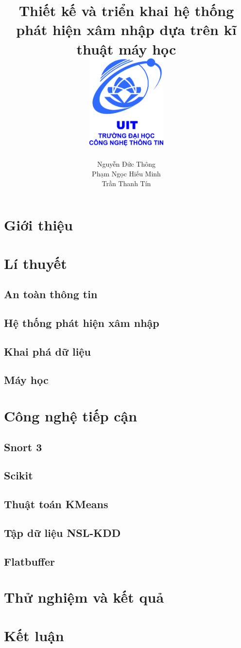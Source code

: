 \documentclass[12pt,twoside]{report}
\title{
    {Thiết kế và triển khai hệ thống phát hiện xâm nhập dựa trên kĩ thuật máy học}\\
    {\includegraphics[width=4cm]{logo}}
}
\author{
    Nguyễn Đức Thông
    \\
    Phạm Ngọc Hiếu Minh
    \\
    Trần Thanh Tín
}
\begin{document}
\maketitle
\newpage
\tableofcontents
\listoffigures
\listoftables
\newpage

    \chapter{Giới thiệu}
    
    \newpage
    \chapter{Lí thuyết}
    \section{An toàn thông tin}
    
    \section{Hệ thống phát hiện xâm nhập}
    
    \section{Khai phá dữ liệu}
    
    \section{Máy học}
    
    \newpage
    \chapter{Công nghệ tiếp cận}
    \section{Snort 3}
    
    \section{Scikit}
    
    \section{Thuật toán KMeans}
    
    \section{Tập dữ liệu NSL-KDD}
    
    \section{Flatbuffer}
    
    \newpage
    \chapter{Thử nghiệm và kết quả}
    
    \newpage
    \chapter{Kết luận}
    

\newpage


\end{document}
